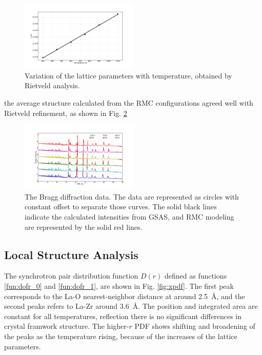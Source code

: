 \documentclass[twoside,twocolumn,9pt]{article}
\begin{document}
\begin{figure}
\centering
\includegraphics[width=0.5\textwidth]{Pics/lattice.pdf}
\caption{Variation of the lattice parameters with temperature, obtained by Rietveld analysis. }
\label{fig:lattice}
\end{figure}

the average structure calculated from the RMC configurations agreed well with Rietveld refinement, as shown in Fig. \ref{fig:Rietveld_refinement}



\begin{figure}
\centering
\includegraphics[width=0.5\textwidth]{Pics/bragg.pdf}
\caption{The Bragg diffraction data. The data are represented as circles with constant offset to separate those curves.
The solid black lines indicate the  calculated intensities from GSAS, and RMC modeling are represented by the solid red lines. }
\label{fig:Rietveld_refinement}
\end{figure}

\subsection{Local Structure Analysis}
The synchrotron pair distribution function $D(r)$ defined as functions \ref{fun:dofr_0} and \ref{fun:dofr_1}, are shown in Fig. \ref{fig:xpdf}.
The first peak corresponds to the La-O nearest-neighbor distance at around 2.5~\AA, and the second peaks refers to La-Zr around 3.6~\AA.
The position and integrated area are constant for all temperatures,
reflection there is no significant differences in crystal framwork structure. The higher-$r$ PDF shows shifting and broadening of the peaks as the temperature rising,
because of the increases of the lattice parameters.
\end{document}
